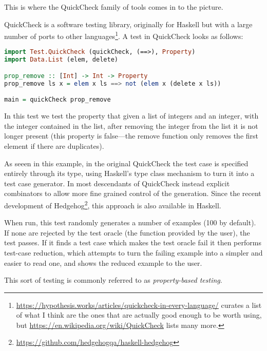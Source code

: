 This is where the QuickCheck\cite{DBLP:conf/icfp/ClaessenH00} family of tools comes in to the picture.

QuickCheck is a software testing library,
originally for Haskell but with a large number of ports to other languages\footnote{
\url{https://hypothesis.works/articles/quickcheck-in-every-language/} curates a list of what I think are the ones that are actually good enough to be worth using,
but \url{https://en.wikipedia.org/wiki/QuickCheck} lists many more.
}.
A test in QuickCheck looks as follows:

\begin{lstlisting}[language=Haskell]
import Test.QuickCheck (quickCheck, (==>), Property)
import Data.List (elem, delete)

prop_remove :: [Int] -> Int -> Property
prop_remove ls x = elem x ls ==> not (elem x (delete x ls))

main = quickCheck prop_remove
\end{lstlisting}

In this test we test the property that given a list of integers and an integer,
with the integer contained in the list,
after removing the integer from the list it is not longer present (this property is false---the
remove function only removes the first element if there are duplicates).

As seeen in this example,
in the original QuickCheck the test case is specified entirely through its type,
using Haskell's type class mechanism to turn it into a test case generator.
In most descendants of QuickCheck instead explicit combinators to allow more fine grained control of the generation.
Since the recent development of Hedgehog\footnote{\url{https://github.com/hedgehogqa/haskell-hedgehog}},
this approach is also available in Haskell.

When run, this test randomly generates a number of examples (100 by default).
If none are rejected by the test oracle (the function provided by the user),
the test passes.
If it finds a test case which makes the test oracle fail it then performs test-case reduction\cite{DBLP:conf/issta/HildebrandtZ00, DBLP:conf/pldi/RegehrCCEEY12},
which attempts to turn the failing example into a simpler and easier to read one,
and shows the reduced example to the user.

This sort of testing is commonly referred to as \emph{property-based testing}\cite{DBLP:conf/erlang/ArtsHJW06}.


